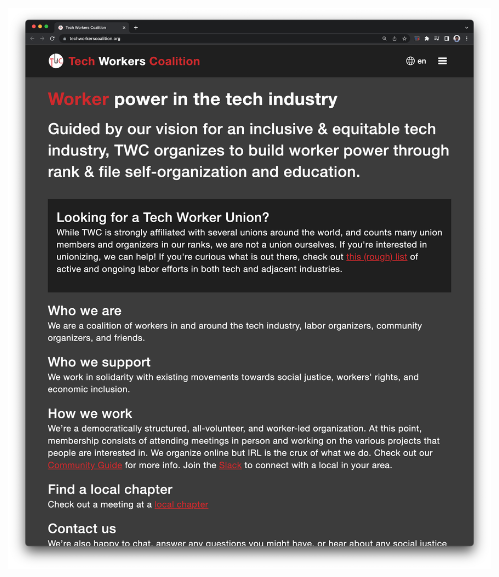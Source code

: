 \documentclass[aspectratio=43,17pt]{beamer} %
\begin{document}
\begin{frame}[plain]

\begin{columns}
\begin{column}{0.33\textwidth}

\hspace*{-1.5em}
\includegraphics[width=1.5\textwidth]{figures/news/twc_2.png}

\end{column}
\begin{column}{0.33\textwidth}


\end{column}
\end{columns}
\end{frame}
\end{document}
